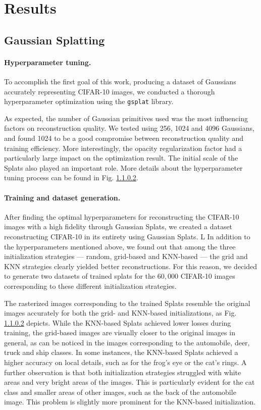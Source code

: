 \section{Results}
\label{sec:results}

\subsection{Gaussian Splatting}
\paragraph{Hyperparameter tuning.} To accomplish the first goal of this work, producing a dataset of Gaussians accurately representing CIFAR-10 images, we conducted a thorough hyperparameter optimization using the \texttt{gsplat} library. 

As expected, the number of Gaussian primitives used was the most influencing factors on reconstruction quality. We tested using 256, 1024 and 4096 Gaussians, and found 1024 to be a good compromise between reconstruction quality and training efficiency. More interestingly, the opacity regularization factor had a particularly large impact on the optimization result. The initial scale of the Splats also played an important role.  More details about the hyperparameter tuning process can be found in Fig. \ref{}.

\paragraph{Training and dataset generation.}
After finding the optimal hyperparameters for reconstructing the CIFAR-10 images with a high fidelity through Gaussian Splats, we created a dataset reconstructing CIFAR-10 in its entirety using Gaussian Splats. 
L
In addition to the hyperparameters mentioned above, we found out that among the three initialization strategies — random, grid-based and KNN-based — the grid and KNN strategies clearly yielded better reconstructions. For this reason, we decided to generate two datasets of trained splats for the $60,000$ CIFAR-10 images corresponding to these different initialization strategies.

The rasterized images corresponding to the trained Splats resemble the original images accurately for both the grid- and KNN-based initializations, as Fig. \ref{} depicts. While the KNN-based Splats achieved lower losses during training, the grid-based images are visually closer to the original images in general, as can be noticed in the images corresponding to the automobile, deer, truck and ship classes. In some instances, the KNN-based Splats achieved a higher accuracy on local details, such as for the frog's eye or the cat's rings. A further observation is that both initialization strategies struggled with white areas and very bright areas of the images. This is particularly evident for the cat class and smaller areas of other images,
such as the back of the automobile image. This problem is slightly more prominent for the KNN-based initialization. 

